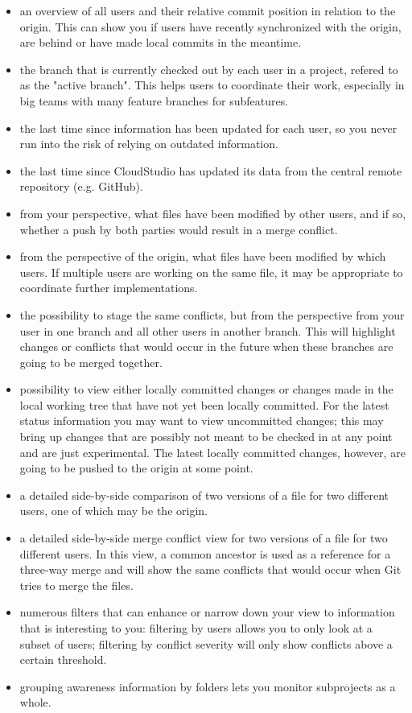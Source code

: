 \begin{itemize}


\item an overview of all users and their relative commit position in relation to the origin. This can show you if users have recently synchronized with the origin, are behind or have made local commits in the meantime.
\item the branch that is currently checked out by each user in a project, refered to as the "active branch". This helps users to coordinate their work, especially in big teams with many feature branches for subfeatures.
\item the last time since information has been updated for each user, so you never run into the risk of relying on outdated information.
\item the last time since CloudStudio has updated its data from the central remote repository (e.g. GitHub).
\item from your perspective, what files have been modified by other users, and if so, whether a push by both parties would result in a merge conflict.
\item from the perspective of the origin, what files have been modified by which users. If multiple users are working on the same file, it may be appropriate to coordinate further implementations.
\item the possibility to stage the same conflicts, but from the perspective from your user in one branch and all other users in another branch. This will highlight changes or conflicts that would occur in the future when these branches are going to be merged together.
\item possibility to view either locally committed changes or changes made in the local working tree that have not yet been locally committed. For the latest status information you may want to view uncommitted changes; this may bring up changes that are possibly not meant to be checked in at any point and are just experimental. The latest locally committed changes, however, are going to be pushed to the origin at some point.
\item a detailed side-by-side comparison of two versions of a file for two different users, one of which may be the origin.
\item a detailed side-by-side merge conflict view for two versions of a file for two different users. In this view, a common ancestor is used as a reference for a three-way merge and will show the same conflicts that would occur when Git tries to merge the files.
\item numerous filters that can enhance or narrow down your view to information that is interesting to you: filtering by users allows you to only look at a subset of users; filtering by conflict severity will only show conflicts above a certain threshold.
\item grouping awareness information by folders lets you monitor subprojects as a whole.

\end{itemize}




